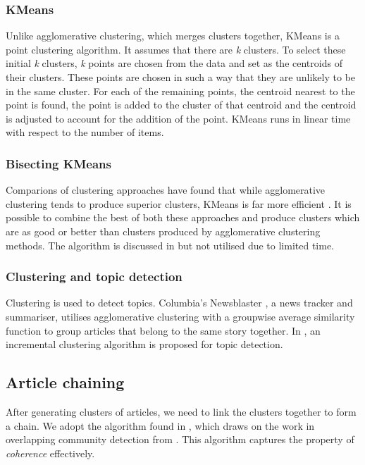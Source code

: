 \documentclass[12pt]{article}
\begin{document}
\subsubsection{KMeans}
Unlike agglomerative clustering, which merges clusters together, KMeans is a point clustering algorithm. It assumes that there are \textit{k} clusters. To select these initial \textit{k} clusters, \textit{k} points are chosen from the data and set as the centroids of their clusters. These points are chosen in such a way that they are unlikely to be in the same cluster. For each of the remaining points, the centroid nearest to the point is found, the point is added to the cluster of that centroid and the centroid is adjusted to account for the addition of the point. KMeans runs in linear time with respect to the number of items.

\subsubsection{Bisecting KMeans}
Comparions of clustering approaches have found that while agglomerative clustering tends to produce superior clusters, KMeans is far more efficient \cite{ctechniquecomp}. It is possible to combine the best of both these approaches and produce clusters which are as good or better than clusters produced by agglomerative clustering methods. The algorithm is discussed in \cite{ctechniquecomp} but not utilised due to limited time.

\subsubsection{Clustering and topic detection}
Clustering is used to detect topics. Columbia's Newsblaster \cite{newsblaster}, a news tracker and summariser, utilises agglomerative clustering with a groupwise average similarity function to group articles that belong to the same story together. In \cite{tdttanalysis}, an incremental clustering algorithm is proposed for topic detection.


\subsection{Article chaining} \label{chainalgo}
After generating clusters of articles, we need to link the clusters together to form a chain. We adopt the algorithm found in \cite{infocartography}, which draws on the work in overlapping community detection from \cite{overlapcom}. This algorithm captures the property of \textit{coherence} effectively.
\end{document}
